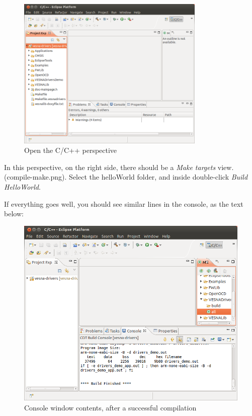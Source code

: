 \documentclass[a4paper, 10pt]{article}
\begin{document}
    \begin{figure}[H]
    \centering
        \includegraphics[width=0.8\textwidth]{./install-guide-linux-images/compile-c-perspective.png}
        \caption{Open the C/C++ perspective}
        \label{fig:compile-c-perspective}
    \end{figure}

In this perspective,
on the right side, there should be a \emph{Make targets} view. (compile-make.png).
Select the helloWorld folder, and inside double-click \emph{Build HelloWorld}.

If everything goes well, you should see similar lines in the console, as the text below:

    \begin{figure}[H]
    \centering
        \includegraphics[width=\textwidth]{./install-guide-linux-images/compile-result.png}
        \caption{Console window contents, after a successful compilation}
        \label{fig:compile-result}
    \end{figure}
\end{document}
